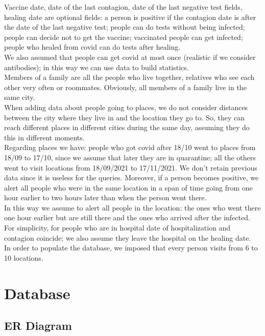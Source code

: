 \documentclass[12pt, a4paper]{article}
\begin{document}
Vaccine date, date of the last contagion, date of the last negative test fields, 
healing date are optional fields: a person is positive if the contagion date is 
after the date of the last negative test; people can do tests without being 
infected; people can decide not to get the vaccine; vaccinated people can get 
infected; people who healed from covid can do tests after healing. \\
We also assumed that people can get covid at most once (realistic if we consider 
antibodies); in this way we can use data to build statistics. \\
Members of a family are all the people who live together, relatives who see 
each other very often or roommates. Obviously, all members of a family live in 
the same city. \\
When adding data about people going to places, we do not consider distances 
between the city where they live in and the location they go to. So, they can 
reach different places in different cities during the same day, assuming they 
do this in different moments. \\
Regarding places we have: people who got covid after 18/10 went to places from 
18/09 to 17/10, since we assume that later they are in quarantine; all the 
others went to visit locations from 18/09/2021 to 17/11/2021. We don’t retain 
previous data since it is useless for the queries. Moreover, if a person becomes 
positive, we alert all people who were in the same location in a span of time 
going from one hour earlier to two hours later than when the person went 
there. \\
In this way we assume to alert all people in the location: the ones who went 
there one hour earlier but are still there and the ones who arrived after the 
infected. \\
For simplicity, for people who are in hospital date of hospitalization and 
contagion coincide; we also assume they leave the hospital on the healing 
date. \\
In order to populate the database, we imposed that every person visits from 6 
to 10 locations. 

\clearpage

\section{Database}

\subsection{ER Diagram}
\end{document}
